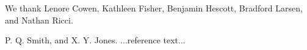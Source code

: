 \documentclass[preprint,nonatbib,blockstyle,nocopyrightspace,times]{sigplanconf}
\begin{document}
% 

\acks

We thank Lenore Cowen, Kathleen Fisher, Benjamin Hescott, Bradford Larsen, and Nathan Ricci.





\begin{thebibliography}{}
\softraggedright

P. Q. Smith, and X. Y. Jones. ...reference text...

\end{thebibliography}
\end{document}
